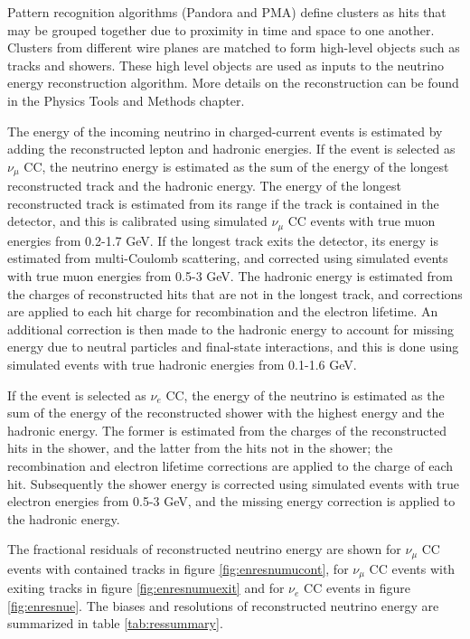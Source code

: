 Pattern recognition algorithms (Pandora and PMA) define clusters as hits that may be grouped together due to proximity in time and space to one another. Clusters from different wire planes are matched to form high-level objects such as tracks and showers. These high level objects are used as inputs to the neutrino energy reconstruction algorithm. More details on the reconstruction can be found in the Physics Tools and Methods chapter.


The energy of the incoming neutrino in charged-current events is estimated by adding the reconstructed lepton and hadronic energies. 
If the event is selected as $\nu_{\mu}$ CC, the neutrino energy is estimated as the sum of the energy of the longest reconstructed track and the hadronic energy. The energy of the longest reconstructed track is estimated from its range if the track is contained in the detector, and this is calibrated using simulated $\nu_{\mu}$ CC events with true muon energies from 0.2-1.7 GeV. If the longest track exits the detector, its energy is estimated from multi-Coulomb scattering, and corrected using simulated events with true muon energies from 0.5-3 GeV. The hadronic energy is estimated from the charges of reconstructed hits that 
are not in the longest track, and corrections are applied to each hit charge for recombination and the electron lifetime. An additional correction is then made to the hadronic energy to account for missing energy due to neutral particles and final-state interactions, and this is done using simulated events with true hadronic energies from 0.1-1.6 GeV. 

If the event is selected as $\nu_{e}$ CC, the energy of the 
neutrino is estimated as the sum of the energy of the reconstructed shower with the highest energy and the hadronic energy. The former is estimated from the charges of the reconstructed hits in the shower, and the latter from the hits not in the shower; the recombination and electron lifetime corrections are applied to the charge of each hit. Subsequently the shower energy is corrected using simulated events with true electron energies from 0.5-3 GeV, and the missing energy correction is applied to the hadronic energy.

The fractional residuals of reconstructed neutrino energy are shown for $\nu_{\mu}$ CC events with contained tracks in figure \ref{fig:enresnumucont}, for $\nu_{\mu}$ CC events with exiting tracks in figure \ref{fig:enresnumuexit} and for $\nu_{e}$ CC events in figure \ref{fig:enresnue}. The biases and resolutions of reconstructed neutrino energy are summarized in table \ref{tab:ressummary}.

